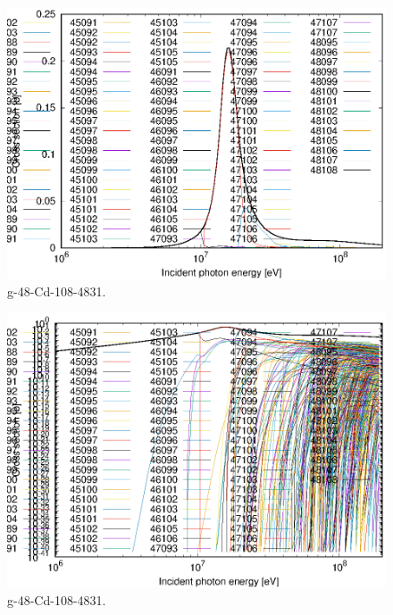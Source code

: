 \begin{figure}
 \includegraphics[width=\linewidth]{eps/g_48-Cd-108_4831.eps}
  \caption{g-48-Cd-108-4831.}
\end{figure}
\begin{figure}
 \includegraphics[width=\linewidth]{eps-log/g_48-Cd-108_4831.eps}
 \caption{g-48-Cd-108-4831.}
\end{figure}
\newpage \clearpage

